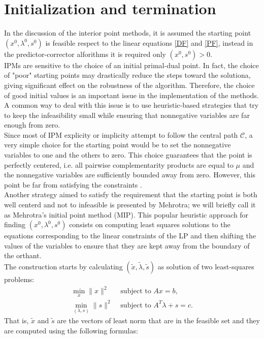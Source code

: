 \documentclass[a4paper,10 pt,titlepage,twoside]{book}
\theoremstyle{plain}
\theoremstyle{definition}
\theoremstyle{remark}
\begin{document}
\section*{Initialization and termination}
In the discussion of the interior point methods, it is assumed the starting point $(x^{0}, \lambda^{0}, s^{0})$ is feasible respect to the linear equations \ref{DF} and \ref{PF}, instead in the predictor-corrector alforithms it is required only $(x^{0},s^{0})>0$.\\
IPMs are sensitive to the choice of an initial primal-dual point. In fact, the choice of "poor" starting points may drastically reduce the steps toward the solutiona, giving significant effect on the robustness of the algorithm. Therefore, the choice of good initial values is an important issue in the implementation of the methods. A common way to deal with this issue is to use heuristic-based strategies that try to keep the infeasibility small while ensuring that nonnegative variables are far enough from zero.\\
Since most of IPM explicity or implicity attempt to follow the central path $\mathcal{C}$, a very simple choice for the starting point would be to set the nonnegative variables to one and the others to zero. This choice guarantees that the point is perfectly centered, i.e. all pairwise complementarity products are equal to $\mu$ and the nonnegative variables are sufficiently bounded away from zero. However, this point be far from satisfying the constraints \cite{VAN}.\\
Another strategy aimed to satisfy the requirement that the starting point is both well centerd and not to infeasible is presented \cite{MER} by Mehrotra; we will briefly call it as Mehrotra's initial point method (MIP). This popular heuristic approach for finding $(x^{0}, \lambda^{0}, s^{0})$ consists on computing least squares solutions to the equations corresponding to the linear constraints of the LP and then shifting the values of the variables to ensure that they are kept away from the boundary of the orthant. \\
The construction starts by calculating $(\tilde{x}, \tilde{\lambda}, \tilde{s})$ as solution of two least-squares problems:
\begin{align*}
\min\limits_{x} \lVert x \rVert ^{2} &\text{ subject to }Ax = b,\\
\min\limits_{(\lambda,s)} \lVert s \rVert ^{2} &\text{ subject to } A^{T}\lambda +s = c.
\end{align*}
That is, $\tilde{x}$ and $\tilde{s}$ are the vectors of least norm that are in the feasible set and they are computed using the following formulas:
\end{document}
